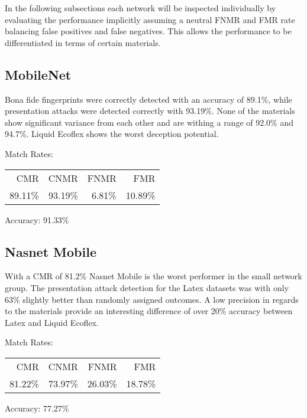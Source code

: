 \smallskip\noindent
In the following subsections each network will be inspected individually by evaluating the performance implicitly assuming a neutral FNMR and FMR rate balancing false positives and false negatives.
This allows the performance to be differentiated in terms of certain materials.


\bigskip
\subsection{MobileNet}
\begin{minipage}[c]{0.7\textwidth}
    Bona fide fingerprints were correctly detected with an accuracy of 89.1\%, while presentation attacks were detected correctly with 93.19\%.
    None of the materials show significant variance from each other and are withing a range of 92.0\% and 94.7\%.
    Liquid Ecoflex shows the worst deception potential.

    \medskip\noindent\centering Match Rates: 
    \begin{tabular}{ r  r  r  r |}
        CMR     & CNMR          & FNMR                 & FMR    \\
        89.11\% & 93.19\%       & 6.81\%               & 10.89\% \\
    \end{tabular} \hspace{2mm} Accuracy: 91.33\%
\end{minipage}
\hfill
\begin{minipage}[c]{0.3\textwidth}
    \centering
    
\end{minipage}


\bigskip
\subsection{Nasnet Mobile}
\begin{minipage}[c]{0.7\textwidth}

    With a CMR of 81.2\% Nasnet Mobile is the worst performer in the small network group.
    The presentation attack detection for the Latex datasets was with only 63\% slightly better than randomly assigned outcomes.
    A low precision in regards to the materials provide an interesting difference of over 20\% accuracy between Latex and Liquid Ecoflex.

    \medskip\noindent\centering Match Rates: 
    \begin{tabular}{ r  r  r  r |}
        CMR     & CNMR          & FNMR                 & FMR     \\
        81.22\% & 73.97\%       & 26.03\%              & 18.78\%  \\
    \end{tabular} \hspace{2mm} Accuracy: 77.27\%
\end{minipage}
\hfill
\begin{minipage}[c]{0.3\textwidth}
    \centering
    
\end{minipage}



